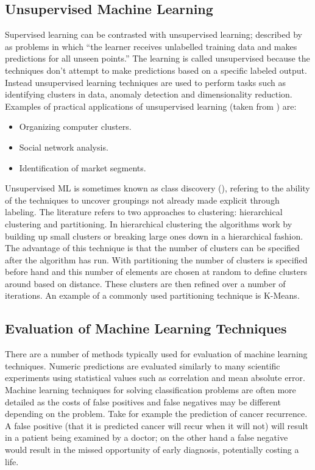\subsection{Unsupervised Machine Learning}

Supervised learning can be contrasted with unsupervised learning; described by \cite{mohri2012foundations} as problems in which ``the learner receives unlabelled training data and makes predictions for all unseen points.'' The learning is called unsupervised because the techniques don't attempt to make predictions based on a specific labeled output. Instead unsupervised learning techniques are used to perform tasks such as identifying clusters in data, anomaly detection and dimensionality reduction. Examples of practical applications of unsupervised learning (taken from \cite{ng2000cs229}) are:

\begin{itemize}
  \item Organizing computer clusters.
  \item Social network analysis.
  \item Identification of market segments.
\end{itemize}

Unsupervised ML is sometimes known as class discovery (\cite{gentleman2008unsupervised}), refering to the ability of the techniques to uncover groupings not already made explicit through labeling. The literature refers to two approaches to clustering: hierarchical clustering and partitioning. In hierarchical clustering the algorithms work by building up small clusters or breaking large ones down in a hierarchical fashion. The advantage of this technique is that the number of clusters can be specified after the algorithm has run. With partitioning the number of clusters is specified before hand and this number of elements are chosen at random to define clusters around based on distance. These clusters are then refined over a number of iterations. An example of a commonly used partitioning technique is K-Means.


\subsection{Evaluation of Machine Learning Techniques}

There are a number of methods typically used for evaluation of machine learning techniques. Numeric predictions are evaluated similarly to many scientific experiments using statistical values such as correlation and mean absolute error. Machine learning techniques for solving classification problems are often more detailed as the costs of false positives and false negatives may be different depending on the problem. Take for example the prediction of cancer recurrence. A false positive (that it is predicted cancer will recur when it will not) will result in a patient being examined by a doctor; on the other hand a false negative would result in the missed opportunity of early diagnosis, potentially costing a life.

